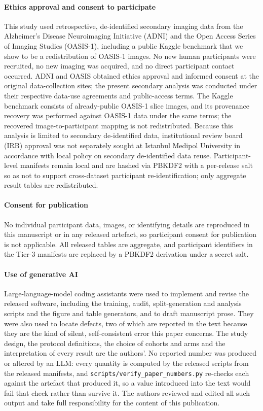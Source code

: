 \documentclass[pdflatex,sn-vancouver-num]{sn-jnl}
\newcommand{\pb}{\discretionary{}{}{}}
\begin{document}
\paragraph*{Ethics approval and consent to participate}
This study used retrospective, de-identified secondary imaging data
from the Alzheimer's Disease Neuroimaging Initiative (ADNI) and the
Open Access Series of Imaging Studies (OASIS-1), including a public
Kaggle benchmark that we show to be a redistribution of OASIS-1
images. No new human participants
were recruited, no new imaging was acquired, and no direct participant
contact occurred. ADNI and OASIS obtained ethics approval and
informed consent at the original data-collection sites; the present
secondary analysis was conducted under their respective data-use
agreements and public-access terms. The Kaggle benchmark consists of
already-public OASIS-1 slice images, and its provenance recovery was
performed against OASIS-1 data under the same terms; the recovered
image-to-participant mapping is not redistributed. Because this analysis
is limited to secondary de-identified data, institutional review
board (IRB) approval was not separately sought at Istanbul Medipol
University in accordance with local policy on secondary de-identified
data reuse. Participant-level manifests remain local and are hashed
via PBKDF2 with a per-release salt so as not to support cross-dataset
participant re-identification; only aggregate result tables are
redistributed.

\paragraph*{Consent for publication}
No individual participant data, images, or identifying details are
reproduced in this manuscript or in any released artefact, so
participant consent for publication is not applicable. All released
tables are aggregate, and participant identifiers in the Tier-3
manifests are replaced by a PBKDF2 derivation under a secret salt.

\paragraph*{Use of generative AI}
Large-language-model coding assistants were used to implement and revise the
released software, including the training, audit, split-generation and analysis
scripts and the figure and table generators, and to draft manuscript prose.
They were also used to locate defects, two of which are reported in the text
because they are the kind of silent, self-consistent error this paper concerns.
The study design, the protocol definitions, the choice of cohorts and arms and
the interpretation of every result are the authors'. No reported number was
produced or altered by an LLM: every quantity is computed by the released
scripts from the released manifests, and
\texttt{scripts/\pb verify\_paper\_numbers.py} re-checks each against the
artefact that produced it, so a value introduced into the text would fail that
check rather than survive it. The authors reviewed and edited all such output
and take full responsibility for the content of this publication.
\end{document}
